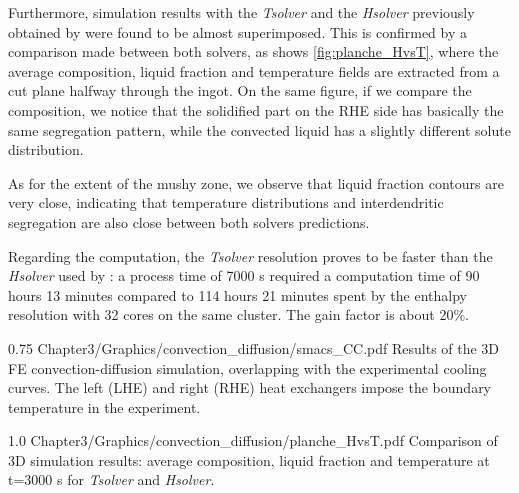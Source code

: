 Furthermore, simulation results with the \emph{Tsolver} and the \emph{Hsolver} 
previously obtained by \citet{carozzani_direct_2013} were 
found to be almost superimposed. This is confirmed by a comparison made 
between both solvers, as shows \cref{fig:planche_HvsT}, where the average composition, 
liquid fraction and temperature fields are extracted from a cut plane halfway through the ingot. 
On the same figure, if we compare the composition, we notice that the solidified part on the RHE 
side has basically the same segregation pattern, while the convected liquid has a slightly different 
solute distribution. 

As for the extent of the mushy zone, we observe that liquid
fraction contours are very close, indicating that temperature distributions and interdendritic segregation are also close between 
both solvers predictions. 

Regarding the computation, the \emph{Tsolver} resolution proves to be 
faster than the \emph{Hsolver} used by \citet{carozzani_direct_2013}: a process time of 7000 s required a computation time of 90 hours 
13 minutes compared to 114 hours 21 minutes spent by the enthalpy resolution with 32 cores on the same cluster. The gain factor 
is about 20\%.

\begin{figureth}
{0.75}
{Chapter3/Graphics/convection_diffusion/smacs_CC.pdf}
{Results of the 3D FE convection-diffusion simulation, overlapping with the experimental cooling curves.
The left (LHE) and right (RHE) heat exchangers impose the boundary temperature in the experiment.}
\label{fig:validation_convectiondiffusion}
\end{figureth}


\begin{figureth}
{1.0}
{Chapter3/Graphics/convection_diffusion/planche_HvsT.pdf}
{Comparison of 3D simulation results: average composition, liquid fraction and temperature at t=3000 s for \emph{Tsolver} and \emph{Hsolver}.}
\label{fig:planche_HvsT}
\end{figureth}


